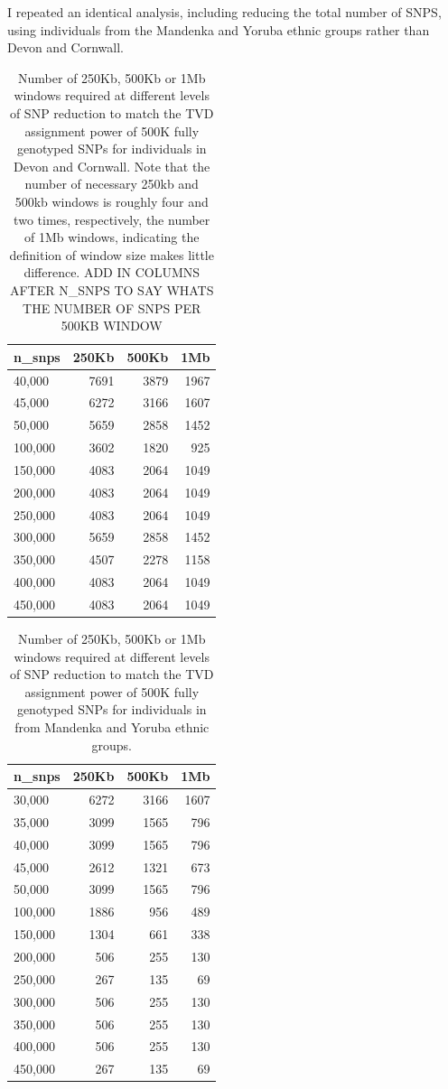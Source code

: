I repeated an identical analysis, including reducing the total number of SNPS, using individuals from the Mandenka and Yoruba ethnic groups rather than Devon and Cornwall.  

\begin{table}
\centering
\begin{tabular}[t]{lrrr}
\toprule
n\_snps & 250Kb & 500Kb & 1Mb\\
\midrule
40,000 & 7691 & 3879 & 1967\\
45,000 & 6272 & 3166 & 1607\\
50,000 & 5659 & 2858 & 1452\\
100,000 & 3602 & 1820 & 925\\
150,000 & 4083 & 2064 & 1049\\
200,000 & 4083 & 2064 & 1049\\
250,000 & 4083 & 2064 & 1049\\
300,000 & 5659 & 2858 & 1452\\
350,000 & 4507 & 2278 & 1158\\
400,000 & 4083 & 2064 & 1049\\
450,000 & 4083 & 2064 & 1049\\
\bottomrule
\end{tabular}
\caption{Number of 250Kb, 500Kb or 1Mb windows required at different levels of SNP reduction to match the TVD assignment power of 500K fully genotyped SNPs for individuals in Devon and Cornwall. Note that the number of necessary 250kb and 500kb windows is roughly four and two times, respectively, the number of 1Mb windows, indicating the definition of window size makes little difference. ADD IN COLUMNS AFTER N\_SNPS TO SAY WHATS THE NUMBER OF SNPS PER 500KB WINDOW}
\label{table:windows_power_table_DevCorn}
\end{table}

\begin{table}[!h]
\centering
\begin{tabular}[t]{lrrr}
\toprule
n\_snps & 250Kb & 500Kb & 1Mb\\
\midrule
30,000 & 6272 & 3166 & 1607\\
35,000 & 3099 & 1565 & 796\\
40,000 & 3099 & 1565 & 796\\
45,000 & 2612 & 1321 & 673\\
50,000 & 3099 & 1565 & 796\\
100,000 & 1886 & 956 & 489\\
150,000 & 1304 & 661 & 338\\
200,000 & 506 & 255 & 130\\
250,000 & 267 & 135 & 69\\
300,000 & 506 & 255 & 130\\
350,000 & 506 & 255 & 130\\
400,000 & 506 & 255 & 130\\
450,000 & 267 & 135 & 69\\
\bottomrule
\end{tabular}
\caption{Number of 250Kb, 500Kb or 1Mb windows required at different levels of SNP reduction to match the TVD assignment power of 500K fully genotyped SNPs for individuals in from Mandenka and Yoruba ethnic groups.}
\end{table}

